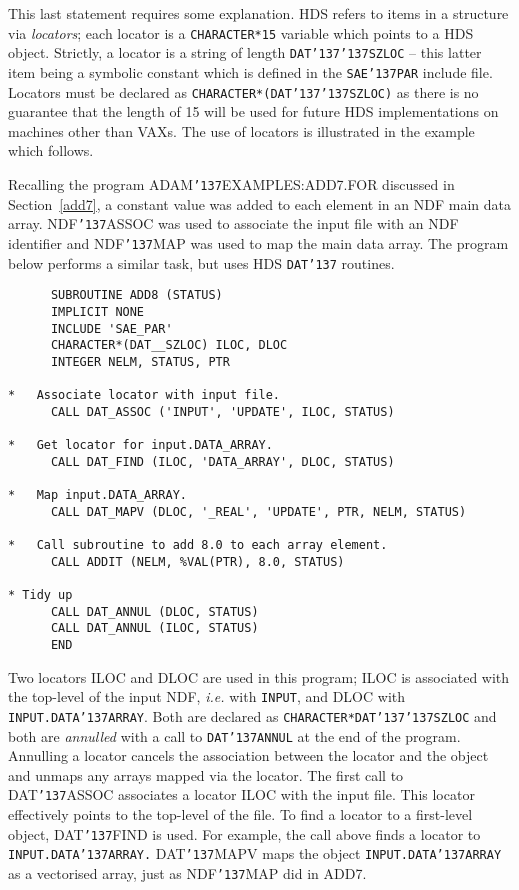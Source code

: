 \documentclass[twoside,11pt]{article}
\renewcommand{\_}{{\tt\char'137}}
\begin{document}
This last statement requires some explanation.
HDS refers to items in a structure via {\sl locators}; each
locator is a {\tt CHARACTER*15} variable which points to a HDS object.
Strictly, a locator is a string of length {\tt DAT\_\_SZLOC} -- this latter
item being a symbolic constant which is defined in the {\tt SAE\_PAR}
include file.
Locators must be declared as {\tt CHARACTER*(DAT\_\_SZLOC)} as there is no
guarantee that the length of 15 will be
used for future HDS implementations on machines other
than VAXs.
The use of locators is illustrated in the example which follows.

Recalling the program ADAM\_EXAMPLES:ADD7.FOR discussed in
Section~\ref{add7}, a constant value was added to each element in
an NDF main data array. NDF\_ASSOC was used to associate the input file
with an NDF identifier and NDF\_MAP was used to map the main data array.
The program below performs a similar task, but uses HDS {\tt DAT\_} routines.
\begin{verbatim}
      SUBROUTINE ADD8 (STATUS)
      IMPLICIT NONE
      INCLUDE 'SAE_PAR'
      CHARACTER*(DAT__SZLOC) ILOC, DLOC
      INTEGER NELM, STATUS, PTR

*   Associate locator with input file.
      CALL DAT_ASSOC ('INPUT', 'UPDATE', ILOC, STATUS)

*   Get locator for input.DATA_ARRAY.
      CALL DAT_FIND (ILOC, 'DATA_ARRAY', DLOC, STATUS)

*   Map input.DATA_ARRAY.
      CALL DAT_MAPV (DLOC, '_REAL', 'UPDATE', PTR, NELM, STATUS)

*   Call subroutine to add 8.0 to each array element.
      CALL ADDIT (NELM, %VAL(PTR), 8.0, STATUS)

* Tidy up
      CALL DAT_ANNUL (DLOC, STATUS)
      CALL DAT_ANNUL (ILOC, STATUS)
      END
\end{verbatim}
Two locators ILOC and DLOC are used in this program; ILOC  is associated
with the top-level of the input NDF, {\it i.e.} with {\tt INPUT}, and DLOC
with {\tt INPUT.DATA\_ARRAY}.
Both are declared as
{\tt CHARACTER*DAT\_\_SZLOC} and both are {\sl annulled\/} with a call
to {\tt DAT\_ANNUL} at the end of the program.
Annulling a locator cancels the association between the locator and the
object and unmaps any arrays mapped via the locator.
The first call to DAT\_ASSOC associates a locator ILOC with the input file.
This locator effectively points to the top-level of the file.
To find a locator to a first-level object, DAT\_FIND is used.
For example, the call above finds a locator to {\tt INPUT.DATA\_ARRAY.}
DAT\_MAPV maps the object {\tt INPUT.DATA\_ARRAY} as a vectorised array,
just as NDF\_MAP did in ADD7.
\end{document}
